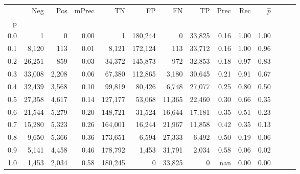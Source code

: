 \begin{tabular}{rrrrrrrrrrrrrr}
\toprule
{} &     Neg &    Pos & mPrec &       TN &       FP &      FN &      TP &  Prec &   Rec & $\hat{p}$ \\
p   &         &        &       &          &          &         &         &       &       &           \\
\midrule
0.0 &       1 &      0 &  0.00 &        1 &  180,244 &       0 &  33,825 &  0.16 &  1.00 &      1.00 \\
0.1 &   8,120 &    113 &  0.01 &    8,121 &  172,124 &     113 &  33,712 &  0.16 &  1.00 &      0.96 \\
0.2 &  26,251 &    859 &  0.03 &   34,372 &  145,873 &     972 &  32,853 &  0.18 &  0.97 &      0.83 \\
0.3 &  33,008 &  2,208 &  0.06 &   67,380 &  112,865 &   3,180 &  30,645 &  0.21 &  0.91 &      0.67 \\
0.4 &  32,439 &  3,568 &  0.10 &   99,819 &   80,426 &   6,748 &  27,077 &  0.25 &  0.80 &      0.50 \\
0.5 &  27,358 &  4,617 &  0.14 &  127,177 &   53,068 &  11,365 &  22,460 &  0.30 &  0.66 &      0.35 \\
0.6 &  21,544 &  5,279 &  0.20 &  148,721 &   31,524 &  16,644 &  17,181 &  0.35 &  0.51 &      0.23 \\
0.7 &  15,280 &  5,323 &  0.26 &  164,001 &   16,244 &  21,967 &  11,858 &  0.42 &  0.35 &      0.13 \\
0.8 &   9,650 &  5,366 &  0.36 &  173,651 &    6,594 &  27,333 &   6,492 &  0.50 &  0.19 &      0.06 \\
0.9 &   5,141 &  4,458 &  0.46 &  178,792 &    1,453 &  31,791 &   2,034 &  0.58 &  0.06 &      0.02 \\
1.0 &   1,453 &  2,034 &  0.58 &  180,245 &        0 &  33,825 &       0 &   nan &  0.00 &      0.00 \\
\bottomrule
\end{tabular}
